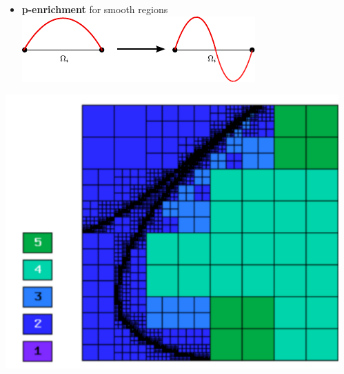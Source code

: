 {\begin{columns}
\begin{column}{.48\textwidth}
  \end{column}
  \begin{column}{.48\textwidth} 
\begin{center}
\vspace{-.4cm}
\begin{itemize}
 \item[\blacksquare]\textbf{p-enrichment} for smooth regions \\
\vspace{.65cm}
\includegraphics[width=.8\textwidth]{pictures/prefine.pdf} \\
\end{itemize}
\vspace{.3cm}
 \includegraphics[width=.6\textwidth]{pictures/hermes2.pdf} \\
\end{center}
  \end{column}
\end{columns}
\vspace{.2cm}   
\centering {}
}

